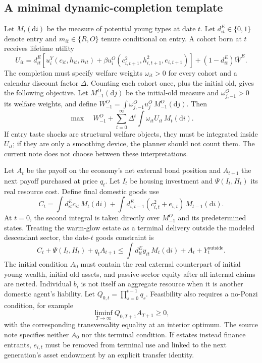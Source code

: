 \documentclass[11pt]{article}
\newcommand{\dd}{\mathrm d}
\newcommand{\1}{\mathbf 1}
\begin{document}
\subsection{A minimal dynamic-completion template}

Let $M_t(\dd i)$ be the measure of potential young types at date $t$. Let
$d_{it}^E\in\{0,1\}$ denote entry and $m_{it}\in\{R,O\}$ tenure conditional on
entry. A cohort born at $t$ receives lifetime utility
\begin{equation}
U_{it}=d_{it}^E\left[u_i^Y(c_{it},h_{it},n_{it})
+\beta u_i^O(c_{i,t+1}^2,h_{i,t+1}^2,e_{i,t+1})\right]
+(1-d_{it}^E)\bar W^E.
\label{eq:cohort_utility}
\end{equation}
The completion must specify welfare weights $\omega_{it}>0$ for every cohort
and a calendar discount factor $\Delta$. Counting each cohort once, plus the
initial old, gives the following objective. Let $M_{-1}^O(\dd j)$ be the
initial-old measure and $\omega_{j,-1}^O>0$ its welfare weights, and define
$W_{-1}^O=\int\omega_{j,-1}^O u_j^O\,M_{-1}^O(\dd j)$. Then
\begin{equation}
\max\quad
W_{-1}^O+
\sum_{t=0}^{\infty}\Delta^t
\int \omega_{it}U_{it}\,M_t(\dd i).
\label{eq:planner_objective}
\end{equation}
If entry taste shocks are structural welfare objects, they must be integrated
inside $U_{it}$; if they are only a smoothing device, the planner should not
count them. The current note does not choose between these interpretations.

Let $A_t$ be the payoff on the economy's net external bond position and
$A_{t+1}$ the next payoff purchased at price $q_t$. Let $I_t$ be housing
investment and $\Psi(I_t,H_t)$ its real resource cost. Define final domestic
goods use
\begin{equation}
C_t=
\int d_{it}^E c_{it}\,M_t(\dd i)
+\int d_{i,t-1}^E(c_{i,t}^2+e_{i,t})\,M_{t-1}(\dd i).
\end{equation}
At $t=0$, the second integral is taken directly over $M_{-1}^O$ and its
predetermined states.
Treating the warm-glow estate as a terminal delivery outside the modeled
descendant sector, the date-$t$ goods constraint is
\begin{equation}
C_t+\Psi(I_t,H_t)+q_tA_{t+1}
\le
\int d_{it}^E y_{it}\,M_t(\dd i)+A_t+Y_t^{\mathrm{outside}}.
\label{eq:planner_goods}
\end{equation}
The initial condition $A_0$ must contain the real external counterpart of
initial young wealth, initial old assets, and passive-sector equity after all
internal claims are netted. Individual $b_i$ is not itself an aggregate
resource when it is another domestic agent's liability. Let
$Q_{0,t}=\prod_{s=0}^{t-1}q_s$. Feasibility also requires a no-Ponzi condition,
for example
\begin{equation}
\liminf_{T\to\infty}Q_{0,T+1}A_{T+1}\ge0,
\label{eq:no_ponzi}
\end{equation}
with the corresponding transversality equality at an interior optimum. The
source note specifies neither $A_0$ nor this terminal condition.
If estates instead finance entrants, $e_{i,t}$ must be removed from terminal
use and linked to the next generation's asset endowment by an explicit transfer
identity.
\end{document}
